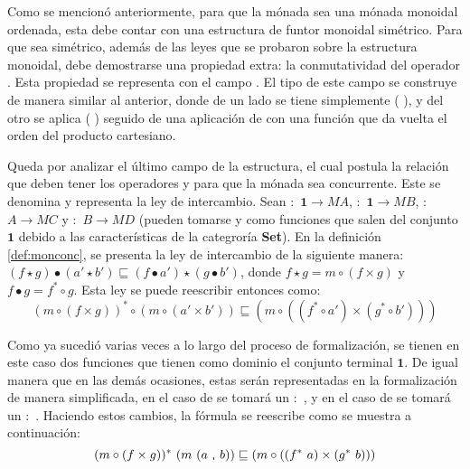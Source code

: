 Como se mencionó anteriormente, para que la mónada sea una mónada monoidal ordenada, esta debe contar con una estructura de funtor monoidal simétrico. Para que sea simétrico, además de las leyes que se probaron sobre la estructura monoidal, debe demostrarse una propiedad extra: la conmutatividad del operador . Esta propiedad se representa con el campo . El tipo de este campo se construye de manera similar al anterior, donde de un lado se tiene simplemente ( ), y del otro se aplica ( ) seguido de una aplicación de \AgdaField{$\gg=$} con una función que da vuelta el orden del producto cartesiano. 

Queda por analizar el último campo de la estructura, el cual postula la relación que deben tener los operadores \AgdaField{$\gg=$} y  para que la mónada sea concurrente. Este se denomina  y representa la ley de intercambio. Sean  $:$ $\mathbf{1} \rightarrow \mathit{M} A$,  $:$ $\mathbf{1} \rightarrow \mathit{M} B$,  $:$ $A \rightarrow \mathit{M} C$ y  $:$ $B \rightarrow \mathit{M} D$ (pueden tomarse  y  como funciones que salen del conjunto $\mathbf{1}$ debido a las características de la categroría \textbf{Set}). En la definición \ref{def:monconc}, se presenta la ley de intercambio de la siguiente manera: $(f \star g) \bullet (a' \star b') \sqsubseteq (f \bullet a') \star (g \bullet b')$, donde $f \star g = m \circ (f \times g)$ y $f \bullet g = f^* \circ g$. Esta ley se puede reescribir entonces como:
\begin{equation*}
(m \circ (f \times g))^* \circ (m \circ (a' \times b')) \sqsubseteq (m \circ ((f^* \circ a') \times (g^* \circ b')))
\end{equation*}

Como ya sucedió varias veces a lo largo del proceso de formalización, se tienen en este caso dos funciones que tienen como dominio el conjunto terminal $\mathbf{1}$. De igual manera que en las demás ocasiones, estas serán representadas en la formalización de manera simplificada, en el caso de  se tomará un  $:$ , y en el caso de  se tomará un  $:$ . Haciendo estos cambios, la fórmula se reescribe como se muestra a continuación:
\begin{equation*}
(m \circ (f \times g))^* \ (m\ (a\  \AgdaInductiveConstructor{,}\ b)) \sqsubseteq (m \circ ((f^*\ a) \times (g^*\ b)))
\end{equation*}

